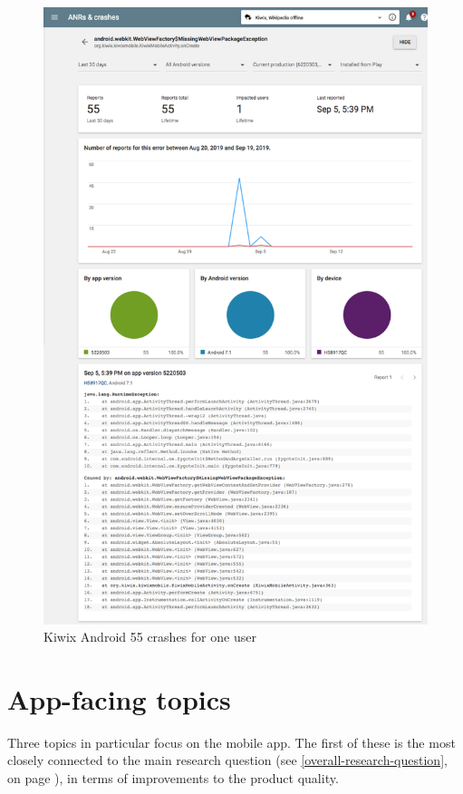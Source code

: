\begin{figure}
    \centering
    \includegraphics[width=0.9\linewidth]{images/android-vitals-screenshots/kiwix/55-crashes-WebViewFactory-MissingWebViewPackageException_2019-09-19-kiwix_trimmed.pdf}
    \caption{Kiwix Android 55 crashes for one user}
    \label{fig:55-crashes-WebViewFactory-MissingWebViewPackageException}
\end{figure}

\FloatBarrier
\section{App-facing topics}
Three topics in particular focus on the mobile app. The first of these is the most closely connected to the main research question (see \ref{overall-research-question}, on page \pageref{overall-research-question}), in terms of improvements to the product quality. 


